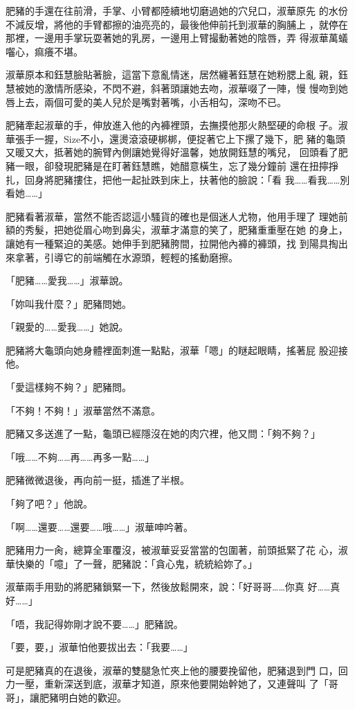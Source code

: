 肥豬的手還在往前滑，手掌、小臂都陸續地切磨過她的穴兒口，淑華原先
的水份不減反增，將他的手臂都擦的油亮亮的，最後他伸前托到淑華的胸脯上
，就停在那裡，一邊用手掌玩耍著她的乳房，一邊用上臂撮動著她的陰唇，弄
得淑華萬蟻囓心，痲癢不堪。

淑華原本和鈺慧臉貼著臉，這當下意亂情迷，居然纏著鈺慧在她粉腮上亂
親，鈺慧被她的激情所感染，不閃不避，斜著頭讓她去吻，淑華啜了一陣，慢
慢吻到她唇上去，兩個可愛的美人兒於是嘴對著嘴，小舌相勾，深吻不已。

肥豬牽起淑華的手，伸放進入他的內褲裡頭，去撫摸他那火熱堅硬的命根
子。淑華張手一握，Size不小，還燙滾滾硬梆梆，便捉著它上下摞了幾下，肥
豬的龜頭又暖又大，抵著她的腕臂內側讓她覺得好溫馨，她放開鈺慧的嘴兒，
回頭看了肥豬一眼，卻發現肥豬是在盯著鈺慧瞧，她醋意橫生，忘了幾分鐘前
還在扭擰掙扎，回身將肥豬摟住，把他一起扯跌到床上，扶著他的臉說：「看
我……看我……別看她……」

肥豬看著淑華，當然不能否認這小騷貨的確也是個迷人尤物，他用手理了
理她前額的秀髮，把她從眉心吻到鼻尖，淑華才滿意的笑了，肥豬重重壓在她
的身上，讓她有一種緊迫的美感。她伸手到肥豬胯間，拉開他內褲的褲頭，找
到陽具掏出來拿著，引導它的前端觸在水源頭，輕輕的搖動磨擦。

「肥豬……愛我……」淑華說。

「妳叫我什麼？」肥豬問她。

「親愛的……愛我……」她說。

肥豬將大龜頭向她身體裡面刺進一點點，淑華「嗯」的瞇起眼睛，搖著屁
股迎接他。

「愛這樣夠不夠？」肥豬問。

「不夠！不夠！」淑華當然不滿意。

肥豬又多送進了一點，龜頭已經隱沒在她的肉穴裡，他又問：「夠不夠？」

「哦……不夠……再……再多一點……」

肥豬微微退後，再向前一挺，插進了半根。

「夠了吧？」他說。

「啊……還要……還要……哦……」淑華呻吟著。

肥豬用力一肏，總算全軍覆沒，被淑華妥妥當當的包圍著，前頭抵緊了花
心，淑華快樂的「噫」了一聲，肥豬說：「貪心鬼，統統給妳了。」

淑華兩手用勁的將肥豬鎖緊一下，然後放鬆開來，說：「好哥哥……你真
好……真好……」

「唔，我記得妳剛才說不要……」肥豬說。

「要，要，」淑華怕他要拔出去：「我要……」

可是肥豬真的在退後，淑華的雙腿急忙夾上他的腰要挽留他，肥豬退到門
口，回力一壓，重新深送到底，淑華才知道，原來他要開始幹她了，又連聲叫
了「哥哥」，讓肥豬明白她的歡迎。

